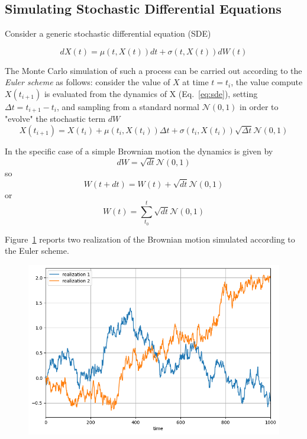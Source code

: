 \documentclass[12pt,a4paper]{article}
\begin{document}
\subsection{Simulating Stochastic Differential Equations}

Consider a generic stochastic differential equation (SDE)

\begin{equation}
dX(t) = \mu(t,X(t))dt + \sigma(t,X(t))dW(t)
\label{eq:sde}
\end{equation}

The Monte Carlo simulation of such a process can be carried out according to the \emph{Euler scheme} as follows: consider the value of $X$ at time $t=t_i$, the value compute $X(t_{i+1})$ is evaluated from the dynamics of X (Eq.~\ref{eq:sde}), setting $\Delta t = t_{i+1} - t_{i}$, and sampling from a standard normal $\mathcal{N}(0,1)$ in order to "evolve" the stochastic term $dW$
\begin{equation}
X(t_{i+1}) = X(t_i) + \mu(t_i,X(t_i))\Delta t + \sigma(t_i,X(t_i))\sqrt{\Delta t}\mathcal{N}(0,1)
\end{equation}

In the specific case of a simple Brownian motion the dynamics is given by
\begin{equation}
dW = \sqrt{dt}\mathcal{N}(0,1)
\end{equation}
so
\begin{equation}
W(t+dt) = W(t) + \sqrt{dt}\mathcal{N}(0,1)
\end{equation}
or
\begin{equation}
W(t) = \sum_{t_0}^{t} \sqrt{dt}\mathcal{N}(0,1)
\end{equation}

Figure~\ref{fig:brownian_motion} reports two realization of the Brownian motion simulated according to the Euler scheme.

\begin{figure}[htbp]
\begin{center}
\includegraphics[width=0.5\linewidth]{addons/brownian_motion}
\end{center}
\label{fig:brownian_motion}
\end{figure}
\end{document}
